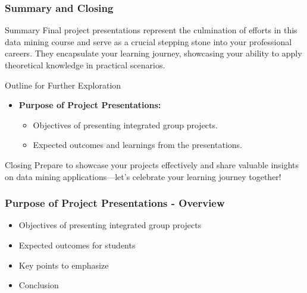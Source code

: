 \documentclass[aspectratio=169]{beamer}
\begin{document}
\begin{frame}[fragile]
    \frametitle{Summary and Closing}
    \begin{block}{Summary}
        Final project presentations represent the culmination of efforts in this data mining course and serve as a crucial stepping stone into your professional careers. They encapsulate your learning journey, showcasing your ability to apply theoretical knowledge in practical scenarios.
    \end{block}

    \begin{block}{Outline for Further Exploration}
        \begin{itemize}
            \item \textbf{Purpose of Project Presentations:}
            \begin{itemize}
                \item Objectives of presenting integrated group projects.
                \item Expected outcomes and learnings from the presentations.
            \end{itemize}
        \end{itemize}
    \end{block}
    
    \begin{block}{Closing}
        Prepare to showcase your projects effectively and share valuable insights on data mining applications—let's celebrate your learning journey together!
    \end{block}
\end{frame}

\begin{frame}[fragile]
    \frametitle{Purpose of Project Presentations - Overview}
    \begin{itemize}
        \item Objectives of presenting integrated group projects
        \item Expected outcomes for students
        \item Key points to emphasize
        \item Conclusion
    \end{itemize}
\end{frame}
\end{document}
